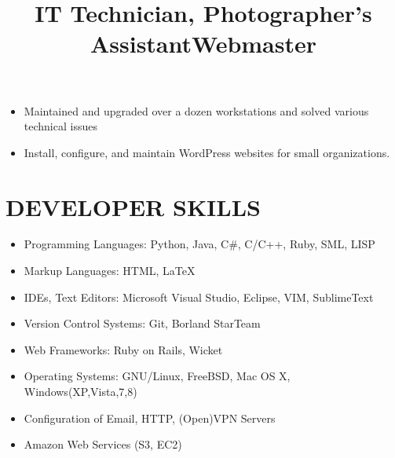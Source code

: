 \documentclass[line, overlapped]{res}
\begin{document}
\begin{resume}
    \title{IT Technician, Photographer's Assistant}
    \begin{position}
        \begin{itemize}
            \item Maintained and upgraded over a dozen workstations and solved various technical issues
        \end{itemize}
    \end{position}

    \title{Webmaster}
    \begin{position}
        \begin{itemize}
            \item Install, configure, and maintain WordPress websites for small organizations.
        \end{itemize}
    \end{position}

	\section{DEVELOPER SKILLS}

	\begin{itemize}[leftmargin=10pt]
		\item Programming Languages:  Python, Java, C\#, C/C++, Ruby, SML, LISP
        \item Markup Languages:  HTML, \LaTeX
        \item IDEs, Text Editors:  Microsoft Visual Studio, Eclipse, VIM, SublimeText
        \item Version Control Systems:  Git, Borland StarTeam
        \item Web Frameworks:  Ruby on Rails, Wicket
	    \item Operating Systems:  GNU/Linux, FreeBSD, Mac OS X, Windows(XP,Vista,7,8)
	    \item Configuration of Email, HTTP, (Open)VPN Servers
        \item Amazon Web Services (S3, EC2)
	\end{itemize}



\end{resume}
\end{document}
